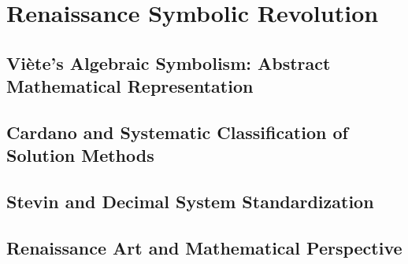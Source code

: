 

\chapter{Renaissance Symbolic Revolution}

\section{Viète's Algebraic Symbolism: Abstract Mathematical Representation}

\section{Cardano and Systematic Classification of Solution Methods}

\section{Stevin and Decimal System Standardization}

\section{Renaissance Art and Mathematical Perspective}
